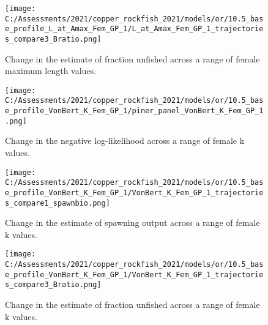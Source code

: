 \documentclass[11pt,
  english,
  a4paper,
]{article}
\begin{document}
\tagmcend\tagstructend


\begin{figure}
\centering
\texttt{[image: C:/Assessments/2021/copper\_rockfish\_2021/models/or/10.5\_base\_profile\_L\_at\_Amax\_Fem\_GP\_1/L\_at\_Amax\_Fem\_GP\_1\_trajectories\_compare3\_Bratio.png]}
\caption{Change in the estimate of fraction unfished across a range of female maximum length values.\label{fig:linf-depl}}
\end{figure}

\tagmcend\tagstructend


\begin{figure}
\centering
\texttt{[image: C:/Assessments/2021/copper\_rockfish\_2021/models/or/10.5\_base\_profile\_VonBert\_K\_Fem\_GP\_1/piner\_panel\_VonBert\_K\_Fem\_GP\_1.png]}
\caption{Change in the negative log-likelihood across a range of female k values.\label{fig:k-profile}}
\end{figure}

\tagmcend\tagstructend


\begin{figure}
\centering
\texttt{[image: C:/Assessments/2021/copper\_rockfish\_2021/models/or/10.5\_base\_profile\_VonBert\_K\_Fem\_GP\_1/VonBert\_K\_Fem\_GP\_1\_trajectories\_compare1\_spawnbio.png]}
\caption{Change in the estimate of spawning output across a range of female k values.\label{fig:k-ssb}}
\end{figure}

\tagmcend\tagstructend


\begin{figure}
\centering
\texttt{[image: C:/Assessments/2021/copper\_rockfish\_2021/models/or/10.5\_base\_profile\_VonBert\_K\_Fem\_GP\_1/VonBert\_K\_Fem\_GP\_1\_trajectories\_compare3\_Bratio.png]}
\caption{Change in the estimate of fraction unfished across a range of female k values.\label{fig:k-depl}}
\end{figure}
\end{document}
